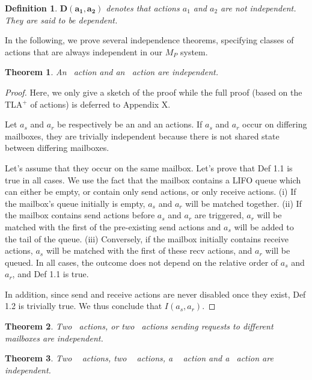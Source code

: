 \documentclass[a4paper,11pt]{article}
\newtheorem{theorem}{Theorem}[section]
\newtheorem{definition}{Definition}
\begin{document}
\begin{definition}
$\mathbf{D(a_1, a_2)}$ denotes that actions $a_1$ and $a_2$ are not independent. They are said to be dependent.
\end{definition}

In the following, we prove several independence theorems, specifying classes of actions that are always independent in our $M_P$ system. 

\begin{theorem}
An \asynsend~action and an \asynreceive~action are independent.
\end{theorem}
\begin{proof}
 Here, we only give a sketch of the proof while the full proof (based on the TLA$^+$ of actions) is deferred to Appendix X.
 
 Let $a_s$ and $a_r$ be respectively be an \asynsend and an \asynreceive actions. If $a_s$ and $a_r$ occur on differing mailboxes, they are trivially independent because there is not shared state between differing mailboxes.
 
 Let's assume that they occur on the same mailbox. Let's prove that Def 1.1 is true in all cases. We use the fact that the mailbox contains a LIFO queue which can either be empty, or contain only send actions, or only receive actions.
(i) If the mailbox's queue initially is empty, $a_s$ and $a_r$ will be matched together. 
(ii) If the mailbox contains send actions before $a_s$ and $a_r$ are triggered, $a_r$ will be matched with the first of the pre-existing send actions and $a_s$ will be added to the tail of the queue. 
(iii) Conversely, if the mailbox initially contains receive actions, $a_s$ will be matched with the first of these recv actions, and $a_r$ will be queued.
In all cases, the outcome does not depend on the relative order of $a_s$ and $a_r$, and Def 1.1 is true. 

In addition, since send and receive actions are never disabled once they exist, Def 1.2 is trivially true. We thus conclude that $I(a_s, a_r)$.
\end{proof}
\begin{theorem}
Two \asynsend~actions, or two \asynreceive~actions sending requests to different mailboxes are independent.
\end{theorem}

\begin{theorem}
Two \wait~ actions, two \test~ actions, a \wait~ action and a \test~action are independent.
\end{theorem}
\end{document}
